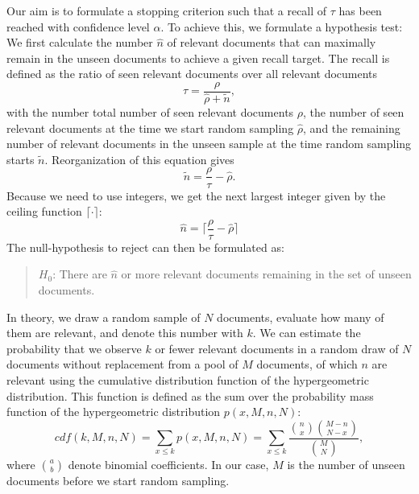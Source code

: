 \documentclass{bmcart}
\begin{document}
	Our aim is to formulate a stopping criterion such that a recall of $\tau$ has been reached with confidence level $\alpha$.
	To achieve this, we formulate a hypothesis test:
	We first calculate the number $\hat{n}$ of relevant documents that can maximally remain in the unseen documents to achieve a given recall target. The recall is defined as the ratio of seen relevant documents over all relevant documents
	\begin{equation}
		\tau = \frac{\rho}{\hat{\rho} + \tilde{n}},
	\end{equation}
	with the number total number of seen relevant documents $\rho$, the number of seen relevant documents at the time we start random sampling $\hat{\rho}$, and the remaining number of relevant documents in the unseen sample at the time random sampling starts $\tilde{n}$.
	Reorganization of this equation gives
	\begin{equation}
		\tilde{n} = \frac{\rho}{\tau} - \hat{\rho}.
	\end{equation}
	Because we need to use integers, we get the next largest integer given by the ceiling function $\lceil \cdot \rceil$:
	\begin{equation}
		\hat{n} = \lceil \frac{\rho}{\tau} - \hat{\rho} \rceil
	\end{equation}
	The null-hypothesis to reject can then be formulated as:
	\begin{quote}
	$H_0$: There are $\hat{n}$ or more relevant documents remaining in the set of unseen documents.
	\end{quote}
	
	
	In theory, we draw a random sample of $N$ documents, evaluate how many of them are relevant, and denote this number with $k$. We can estimate the probability that we observe $k$ or fewer relevant documents in a random draw of $N$ documents without replacement from a pool of $M$ documents, of which $n$ are relevant using the cumulative distribution function of the hypergeometric distribution.
This function is defined as the sum over the probability mass function of the hypergeometric distribution $p(x, M, n, N)$:
	\begin{equation}	
		 cdf(k, M, n, N) = \sum_{x \leq k} p(x, M, n, N) = \sum_{x \leq k} \frac{\binom{n}{x} \binom{M - n}{N - x}} {\binom{M}{N}},
		 \label{pfunc}
	\end{equation}
	where $\binom{a}{b}$ denote binomial coefficients. In our case, $M$ is the number of unseen documents before we start random sampling.
	
\end{document}
